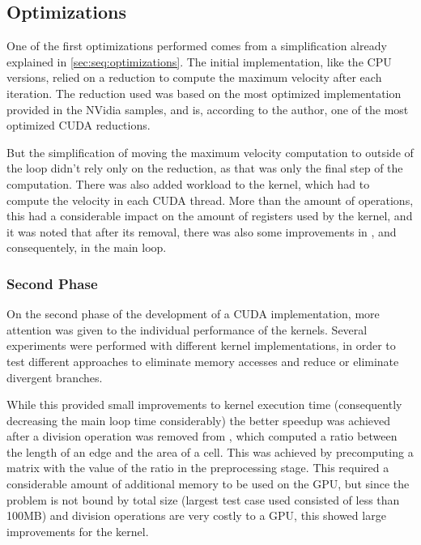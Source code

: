 \subsection{Optimizations}
\label{subsec:cuda:load}


One of the first optimizations performed comes from a simplification already explained in \cref{sec:seq:optimizations}.
The initial implementation, like the CPU versions, relied on a reduction to compute the maximum velocity after each iteration.
The reduction used was based on the most optimized implementation provided in the NVidia samples, and is, according to the author, one of the most optimized CUDA reductions.

But the simplification of moving the maximum velocity computation to outside of the loop didn't rely only on the reduction, as that was only the final step of the computation.
There was also added workload to the \computeflux kernel, which had to compute the velocity in each CUDA thread. More than the amount of operations, this had a considerable impact on the amount of registers used by the kernel, and it was noted that after its removal, there was also some improvements in \computeflux, and consequentely, in the main loop.


\subsubsection{Second Phase}
\label{subsubsec:cuda:load:second}

On the second phase of the development of a CUDA implementation, more attention was given to the individual performance of the kernels.
Several experiments were performed with different kernel implementations, in order to test different approaches to eliminate memory accesses and reduce or eliminate divergent branches.

While this provided small improvements to kernel execution time (consequently decreasing the main loop time considerably) the better speedup was achieved after a division operation was removed from \update, which computed a ratio between the length of an edge and the area of a cell.
This was achieved by precomputing a matrix with the value of the ratio in the preprocessing stage.
This required a considerable amount of additional memory to be used on the GPU, but since the problem is not bound by total size (largest test case used consisted of less than 100MB) and division operations are very costly to a GPU, this showed large improvements for the \update kernel.

